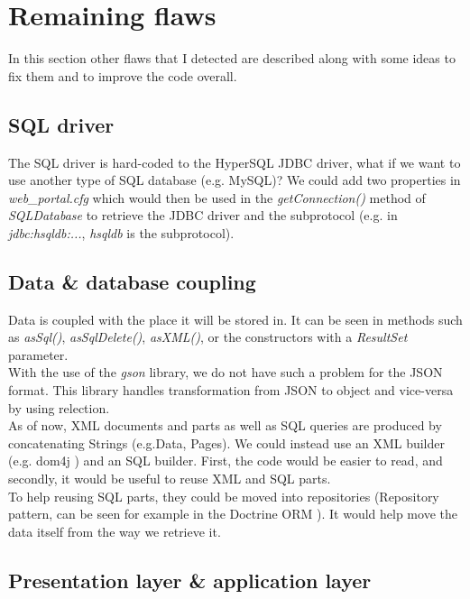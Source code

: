 \section{Remaining flaws}

In this section other flaws that I detected are described along with some ideas
to fix them and to improve the code overall.

\subsection*{SQL driver}
The SQL driver is hard-coded to the HyperSQL JDBC driver, what if we want to use
another type of SQL database (e.g. MySQL)? We could add two properties in
\emph{web\_portal.cfg} which would then be used in the \emph{getConnection()}
method of \emph{SQLDatabase} to retrieve the JDBC driver and the subprotocol
(e.g. in \emph{jdbc:hsqldb:...}, \emph{hsqldb} is the subprotocol).

\subsection*{Data \& database coupling}
Data is coupled with the place it will be stored in. It can be seen in methods
such as \emph{asSql()}, \emph{asSqlDelete()}, \emph{asXML()}, or the
constructors with a \emph{ResultSet} parameter.\\

With the use of the \emph{gson} library, we do not have such a problem for the
JSON format. This library handles transformation from JSON to object and
vice-versa by using relection.\\

As of now, XML documents and parts as well as SQL queries are produced by
concatenating Strings (e.g.Data, Pages). We could instead use an XML builder
(e.g. dom4j \cite{cite:dom4j}) and an SQL builder. First, the code would be
easier to read, and secondly, it would be useful to reuse XML and SQL parts.\\

To help reusing SQL parts, they could be moved into repositories (Repository
pattern, can be seen for example in the Doctrine ORM \cite{cite:doctrine}).
It would help move the data itself from the way we retrieve it.

\subsection*{Presentation layer \& application layer}


